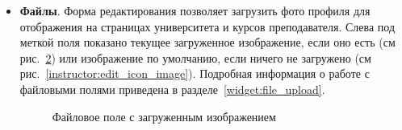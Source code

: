 \begin{itemize}
Видимость преподавателя на сайте настраивается путем переключения значения поля . Неопубликованные преподаватели скрыты на сайте для пользователей. В форме в списке преподавателей показываются как скрытые, так и опубликованные преподаватели. В зависимости от статуса их ФИО имеют различный цвет, подробное описание можно получить, нажав на иконку  рядом с меткой поля (см. рис.~\ref{instructor:edit_instructors_legend}).
		
		\begin{figure}[H]
		\caption{Справка о статусе преподавателей}
		\label{instructor:edit_instructors_legend}
		\end{figure}	
		
		\item \textbf{Файлы}. Форма редактирования позволяет загрузить фото профиля для отображения на страницах университета  и курсов преподавателя. Слева под меткой поля показано текущее загруженное изображение, если оно есть (см рис.~\ref{instructor:edit_logo}) или изображение по умолчанию, если ничего не загружено (см рис.~\ref{instructor:edit_icon_image}). Подробная информация о работе с файловыми полями приведена в разделе~\ref{widget:file_upload}.
		
		\begin{figure}[H]
		\caption{Файловое поле с загруженным изображением}
		\label{instructor:edit_logo}
		\end{figure}	
		

\end{itemize}
